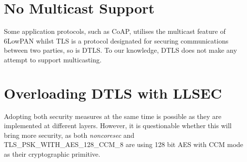 \section{No Multicast Support}
Some application protocols, such as CoAP, utilises the multicast feature of 6LowPAN whilst TLS is a protocol designated for securing communications between two parties, so is DTLS. To  our knowledge, DTLS does not make any attempt to support multicasting.

\section{Overloading DTLS with LLSEC}
Adopting both security measures at the same time is possible as they are implemented at different layers. However, it is questionable whether this will bring more security, as both {\it noncoresec} and TLS\_PSK\_WITH\_AES\_128\_CCM\_8 are using 128 bit AES with CCM mode as their cryptographic primitive.
